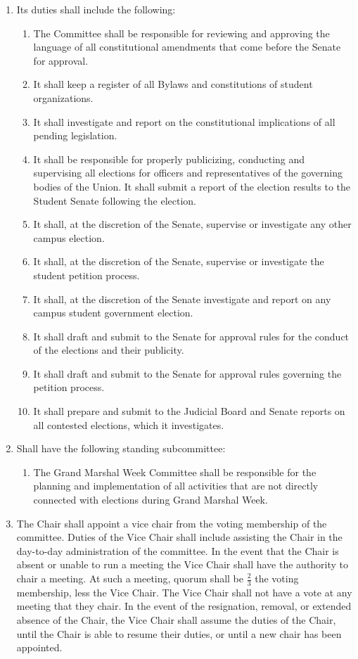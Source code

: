\begin{enumerate}
\item Its duties shall include the following:
\begin{enumerate}
\item The Committee shall be responsible for reviewing and approving the language of all constitutional amendments that
come before the Senate for approval.
\item It shall keep a register of all Bylaws and constitutions of student organizations.
\item It shall investigate and report on the constitutional implications of all pending legislation. 
\item It shall be responsible for properly publicizing, conducting and supervising all elections for officers and
representatives of the governing bodies of the Union. It shall submit a report of the election results to the Student
Senate following the election.
\item It shall, at the discretion of the Senate, supervise or investigate any other campus election.
\item It shall, at the discretion of the Senate, supervise or investigate the student petition process.
\item It shall, at the discretion of the Senate investigate and report on any campus student government election.
\item It shall draft and submit to the Senate for approval rules for the conduct of the elections and their publicity.
\item It shall draft and submit to the Senate for approval rules governing the petition process.
\item It shall prepare and submit to the Judicial Board and Senate reports on all contested elections, which it investigates.
\end{enumerate}

\item Shall have the following standing subcommittee:
\begin{enumerate}
\item The Grand Marshal Week Committee shall be responsible for the planning and implementation of all activities that
are not directly connected with elections during Grand Marshal Week.
\end{enumerate}

\item The Chair shall appoint a vice chair from the voting membership of the committee. Duties of the Vice Chair shall include
assisting the Chair in the day-to-day administration of the committee. In the event that the Chair is absent or unable to run a
meeting the Vice Chair shall have the authority to chair a meeting. At such a meeting, quorum shall be $\frac{2}{3}$ the voting
membership, less the Vice Chair. The Vice Chair shall not have a vote at any meeting that they chair. In the event of the
resignation, removal, or extended absence of the Chair, the Vice Chair shall assume the duties of the Chair, until the Chair
is able to resume their duties, or until a new chair has been appointed.
\end{enumerate}